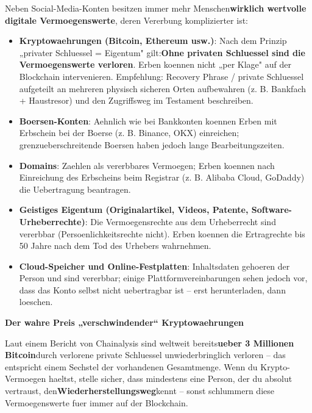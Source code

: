 
Neben Social-Media-Konten besitzen immer mehr Menschen\textbf{wirklich wertvolle digitale Vermoegenswerte}, deren Vererbung komplizierter ist:

\begin{itemize}
  \item \textbf{Kryptowaehrungen (Bitcoin, Ethereum usw.)}: Nach dem Prinzip „privater Schluessel = Eigentum" gilt:\textbf{Ohne privaten Schluessel sind die Vermoegenswerte verloren}. Erben koennen nicht „per Klage" auf der Blockchain intervenieren. Empfehlung: Recovery Phrase / private Schluessel aufgeteilt an mehreren physisch sicheren Orten aufbewahren (z. B. Bankfach + Haustresor) und den Zugriffsweg im Testament beschreiben.
  \item \textbf{Boersen-Konten}: Aehnlich wie bei Bankkonten koennen Erben mit Erbschein bei der Boerse (z. B. Binance, OKX) einreichen; grenzueberschreitende Boersen haben jedoch lange Bearbeitungszeiten.
  \item \textbf{Domains}: Zaehlen als vererbbares Vermoegen; Erben koennen nach Einreichung des Erbscheins beim Registrar (z. B. Alibaba Cloud, GoDaddy) die Uebertragung beantragen.
  \item \textbf{Geistiges Eigentum (Originalartikel, Videos, Patente, Software-Urheberrechte)}: Die Vermoegensrechte aus dem Urheberrecht sind vererbbar (Persoenlichkeitsrechte nicht). Erben koennen die Ertragrechte bis 50 Jahre nach dem Tod des Urhebers wahrnehmen.
  \item \textbf{Cloud-Speicher und Online-Festplatten}: Inhaltsdaten gehoeren der Person und sind vererbbar; einige Plattformvereinbarungen sehen jedoch vor, dass das Konto selbst nicht uebertragbar ist – erst herunterladen, dann loeschen.
\end{itemize}

\textbf{Der wahre Preis „verschwindender“ Kryptowaehrungen}\par

Laut einem Bericht von Chainalysis sind weltweit bereits\textbf{ueber 3 Millionen Bitcoin}durch verlorene private Schluessel unwiederbringlich verloren – das entspricht einem Sechstel der vorhandenen Gesamtmenge. Wenn du Krypto-Vermoegen haeltst, stelle sicher, dass mindestens eine Person, der du absolut vertraust, den\textbf{Wiederherstellungsweg}kennt – sonst schlummern diese Vermoegenswerte fuer immer auf der Blockchain.


